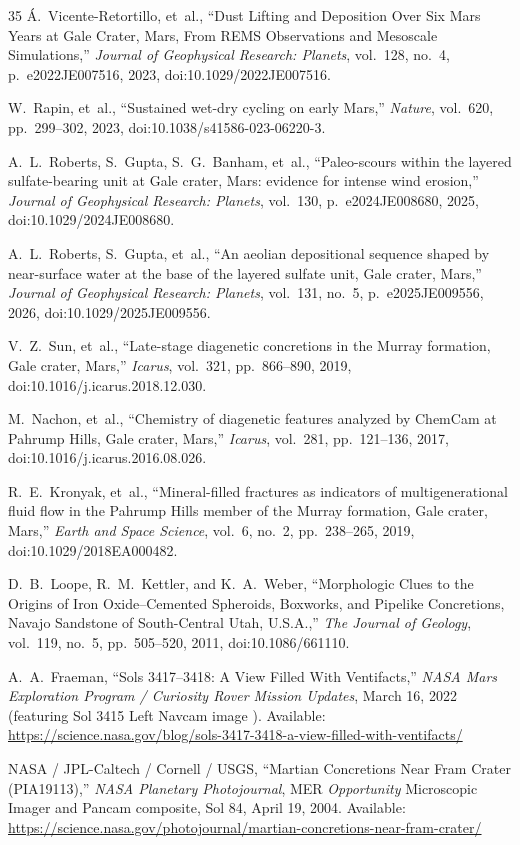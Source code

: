 \documentclass[11pt,a4paper]{article}
\begin{document}
\begin{thebibliography}{35}
	\'{A}.~Vicente-Retortillo, et~al., ``Dust Lifting and Deposition Over Six Mars Years at Gale Crater, Mars, From REMS Observations and Mesoscale Simulations,'' \textit{Journal of Geophysical Research: Planets}, vol.~128, no.~4, p.~e2022JE007516, 2023, doi:10.1029/2022JE007516.

	W.~Rapin, et~al., ``Sustained wet-dry cycling on early Mars,'' \textit{Nature}, vol.~620, pp.~299--302, 2023, doi:10.1038/s41586-023-06220-3.

	A.~L.~Roberts, S.~Gupta, S.~G.~Banham, et~al., ``Paleo-scours within the layered sulfate-bearing unit at Gale crater, Mars: evidence for intense wind erosion,'' \textit{Journal of Geophysical Research: Planets}, vol.~130, p.~e2024JE008680, 2025, doi:10.1029/2024JE008680.

	A.~L.~Roberts, S.~Gupta, et~al., ``An aeolian depositional sequence shaped by near-surface water at the base of the layered sulfate unit, Gale crater, Mars,'' \textit{Journal of Geophysical Research: Planets}, vol.~131, no.~5, p.~e2025JE009556, 2026, doi:10.1029/2025JE009556.

	V.~Z.~Sun, et~al., ``Late-stage diagenetic concretions in the Murray formation, Gale crater, Mars,'' \textit{Icarus}, vol.~321, pp.~866--890, 2019, doi:10.1016/j.icarus.2018.12.030.

	M.~Nachon, et~al., ``Chemistry of diagenetic features analyzed by ChemCam at Pahrump Hills, Gale crater, Mars,'' \textit{Icarus}, vol.~281, pp.~121--136, 2017, doi:10.1016/j.icarus.2016.08.026.

	R.~E.~Kronyak, et~al., ``Mineral-filled fractures as indicators of multigenerational fluid flow in the Pahrump Hills member of the Murray formation, Gale crater, Mars,'' \textit{Earth and Space Science}, vol.~6, no.~2, pp.~238--265, 2019, doi:10.1029/2018EA000482.

	D.~B.~Loope, R.~M.~Kettler, and K.~A.~Weber, ``Morphologic Clues to the Origins of Iron Oxide--Cemented Spheroids, Boxworks, and Pipelike Concretions, Navajo Sandstone of South-Central Utah, U.S.A.,'' \textit{The Journal of Geology}, vol.~119, no.~5, pp.~505--520, 2011, doi:10.1086/661110.

	A.~A.~Fraeman, ``Sols 3417--3418: A View Filled With Ventifacts,'' \textit{NASA Mars Exploration Program / Curiosity Rover Mission Updates}, March 16, 2022 (featuring Sol 3415 Left Navcam image ). Available: \url{https://science.nasa.gov/blog/sols-3417-3418-a-view-filled-with-ventifacts/}

	NASA / JPL-Caltech / Cornell / USGS, ``Martian Concretions Near Fram Crater (PIA19113),'' \textit{NASA Planetary Photojournal}, MER \textit{Opportunity} Microscopic Imager and Pancam composite, Sol 84, April 19, 2004. Available: \url{https://science.nasa.gov/photojournal/martian-concretions-near-fram-crater/}

\end{thebibliography}
\end{document}
